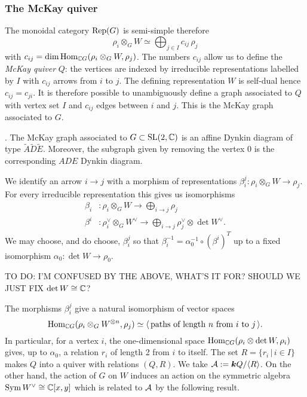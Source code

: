\documentclass{amsart}
\theoremstyle{definition}
\newcommand\W{W}
\begin{document}
\subsubsection{The McKay quiver}
The monoidal category $\operatorname{Rep}(G)$ is semi-simple therefore $$\rho_i \otimes_G \W \simeq \bigoplus_{j \in I} c_{ij} \, \rho_j$$
with $c_{ij} =\dim \Hom_{\bC G}(\rho_i \otimes_G \W, \rho_j)$.
The numbers $c_{ij}$ allow us to define the {\em McKay quiver} $Q$: the vertices are indexed by irreducible representations labelled by $I$ with $c_{ij}$  arrows from $i$ to $j$.
The defining representation $\W$ is self-dual hence $c_{ij} = c_{ji}$.
It is therefore possible to unambiguously define a graph associated to $Q$ with vertex set $I$ and $c_{ij}$ edges between $i$ and $j$. This is the McKay graph associated to $G$.

\begin{theorem}\cite{MR604577}.
The McKay graph associated to $G \subset \operatorname{SL}(2,\mathbb{C})$ is an affine Dynkin diagram of type $\widetilde{A}\widetilde{D}\widetilde{E}$.
Moreover, the subgraph given by removing the vertex $0$ is the corresponding $ADE$ Dynkin diagram.
\end{theorem}

We identify an arrow $i \rightarrow j$ with a morphism of representations $\beta_i^j \colon \rho_i \otimes_G \W \rightarrow \rho_j$.
For every irreducible representation this gives us isomorphisms 
\begin{align}
    \beta_i &\colon \rho_i \otimes_G \W \longrightarrow \bigoplus_{i \rightarrow j} \rho_j \\
    \beta^i &\colon \rho_i^\vee \otimes_G \W^\vee \longrightarrow \bigoplus_{i \rightarrow j} \rho_j^\vee \otimes \det \W^\vee.
\end{align}
We may choose, and do choose, $\beta_i^j$ so that $\beta_i^{-1} = \alpha_0^{-1} \circ (\beta^i)^T$ up to a fixed isomorphism $\alpha_0 \colon \det \W \rightarrow \rho_0$.

TO DO: I'M CONFUSED BY THE ABOVE, WHAT'S IT FOR? SHOULD WE JUST FIX $\operatorname{det} W\cong \mathbb{C}$?

The morphisms $\beta_i^j$ give a natural isomorphism of vector spaces $$\Hom_{\bC G}(\rho_i \otimes_G \W^{\otimes n}, \rho_j) \simeq \langle\, \text{paths of length }n \text{ from }i \text{ to } j\,\rangle.$$
In particular, for a vertex $i$, the one-dimensional space $\Hom_{\bC G} (\rho_i \otimes \det \W, \rho_i)$ gives, up to $\alpha_0$, a relation $r_i$ of length 2 from $i$ to itself.
The set $R = \{r_i \, |\, i \in I\}$ makes $Q$ into a quiver with relations $(Q, R)$. 
We take $\mathcal{A}:= {\boldsymbol{k}} Q/ \langle R\rangle$.
On the other hand, the action of $G$ on $\W$ induces an action on the symmetric algebra $\operatorname{Sym} W^\vee \cong \mathbb{C}[x,y]$ which is related to $\mathcal{A}$ by the following result.
\end{document}
